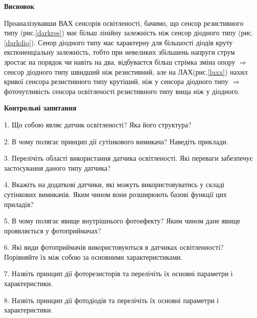 \documentclass[a4paper,14pt]{extreport}
\begin{document}
\begin{center}
\textbf{Висновок}
\end{center}



Проаналізувавши ВАХ сенсорів освітленості, бачимо, що сенсор резистивного типу (рис.\ref{darkres}) має більш лінійну залежність ніж сенсор діодного типу (рис.\ref{darkdio}). Сенор діодного типу має характерну для більшості діодів круту експоненціальну залежність, тобто при невеликих збільшень напруги струм зростає на порядок чи навіть на два, відбуваєтся більш стрімка зміна опору $\Rightarrow$ сенсор діодного типу швидший ніж резистивний, але на ЛАХ(рис.\ref{luxx}) нахил кривої сенсора резистивного типу крутіший, ніж у сенсора діодного типу $\Rightarrow$   фоточутливість сенсора освітленості резистивного типу вища ніж у діодного.


\newpage
\begin{center}
\textbf{Контрольні запитання}
\end{center}


\begin{trivlist}
\item 1. Що собою являє датчик освітленості? Яка його структура?
\item 2. В чому полягає принцип дії сутінкового вимикача? Наведіть приклади.
\item 3. Перелічіть області використання датчика освітленості. Які переваги забезпечує застосування даного типу датчика?
\item 4. Вкажіть на додаткові датчики, які можуть використовуватись у складі сутінкових вимикачів. Яким чином вони розширюють базові функції цих приладів?
\item 5. В чому полягає явище внутрішнього фотоефекту? Яким чином дане явище проявляється у фотоприймачах?
\item 6. Які види фотоприймачів використовуються в датчиках освітленності? Порівняйте їх між собою за основними характеристиками.
\item 7. Назвіть принцип дії фоторезисторів та перелічіть їх основні параметри і характеристики.
\item 8. Назвіть принцип дії фотодіодів та перелічіть їх основні параметри і характеристики.
\end{trivlist}
\end{document}
